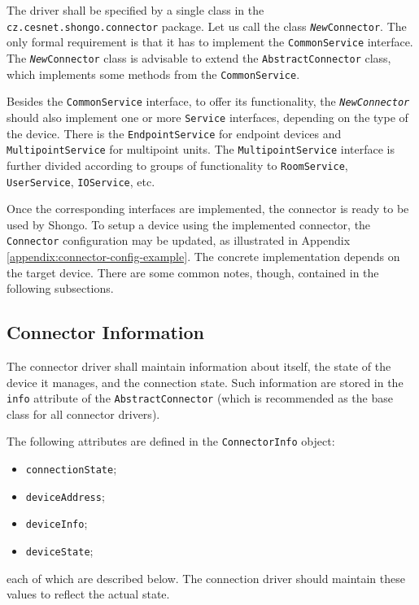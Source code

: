 The driver shall be specified by a single class in the \texttt{cz.cesnet.shongo.connector} package. Let us call the class \texttt{\textit{New}Connector}. The only formal requirement is that it has to implement the \texttt{CommonService} interface. The \texttt{\textit{New}Connector} class is advisable to extend the \texttt{AbstractConnector} class, which implements some methods from the \texttt{CommonService}.

Besides the \texttt{CommonService} interface, to offer its functionality, the \texttt{\textit{NewConnector}} should also implement one or more \texttt{Service} interfaces, depending on the type of the device. There is the \texttt{EndpointService} for endpoint devices and \texttt{MultipointService} for multipoint units. The \texttt{MultipointService} interface is further divided according to groups of functionality to \texttt{RoomService}, \texttt{UserService}, \texttt{IOService}, etc.

Once the corresponding interfaces are implemented, the connector is ready to be used by Shongo. To setup a device using the implemented connector, the \texttt{Connector} configuration may be updated, as illustrated in Appendix \ref{appendix:connector-config-example}. The concrete implementation depends on the target device. There are some common notes, though, contained in the following subsections.


\subsection{Connector Information}

The connector driver shall maintain information about itself, the state of the device it manages, and the connection state. Such information are stored in the \texttt{info} attribute of the \texttt{AbstractConnector} (which is recommended as the base class for all connector drivers).

The following attributes are defined in the \texttt{ConnectorInfo} object:
\begin{itemize}
\item \texttt{connectionState};
\item \texttt{deviceAddress};
\item \texttt{deviceInfo};
\item \texttt{deviceState};
\end{itemize}
each of which are described below. The connection driver should maintain these values to reflect the actual state.

